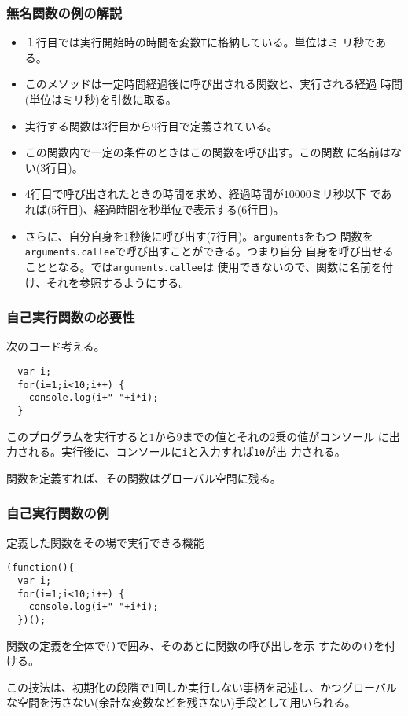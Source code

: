 \begin{frame}[containsverbatim]
\frametitle{無名関数の例の解説}
\begin{itemize}
 \item １行目では実行開始時の時間を変数\Verb+T+に格納している。単位はミ
       リ秒である。
 \item このメソッドは一定時間経過後に呼び出される関数と、実行される経過
       時間(単位はミリ秒)を引数に取る。
 \item 実行する関数は3行目から9行目で定義されている。
 \item この関数内で一定の条件のときはこの関数を呼び出す。この関数
       に名前はない(3行目)。
 \item 4行目で呼び出されたときの時間を求め、経過時間が$10000$ミリ秒以下
       であれば(5行目)、経過時間を秒単位で表示する(6行目)。
 \item さらに、自分自身を1秒後に呼び出す(7行目)。\Verb+arguments+をもつ
       関数を\Verb+arguments.callee+で呼び出すことができる。つまり自分
       自身を呼び出せることとなる。\Strict では\Verb+arguments.callee+は
       使用できないので、関数に名前を付け、それを参照するようにする。
\end{itemize}
\end{frame}
\begin{frame}[containsverbatim]
\frametitle{自己実行関数の必要性}
次のコード考える。
\begin{Verbatim}
  var i;
  for(i=1;i<10;i++) {
    console.log(i+" "+i*i);
  }
\end{Verbatim}
このプログラムを実行すると$1$から$9$までの値とそれの2乗の値がコンソール
に出力される。実行後に、コンソールに\Verb+i+と入力すれば\Verb+10+が出
力される。

関数を定義すれば、その関数はグローバル空間に残る。
\end{frame}
\begin{frame}[containsverbatim]
\frametitle{自己実行関数の例}
定義した関数をその場で実行できる機能
\begin{Verbatim}
(function(){
  var i;
  for(i=1;i<10;i++) {
    console.log(i+" "+i*i);
  })();
\end{Verbatim}
関数の定義を全体で\Verb+()+で囲み、そのあとに関数の呼び出しを示
すための\Verb+()+を付ける。

この技法は、初期化の段階で1回しか実行しない事柄を記述し、かつグローバル
な空間を汚さない(余計な変数などを残さない)手段として用いられる。
\end{frame}

